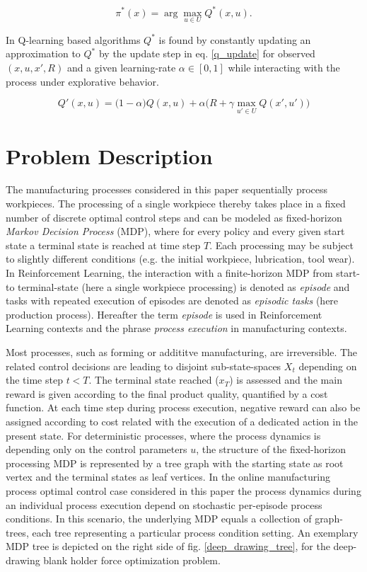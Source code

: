 \begin{equation}
\label{optimal_pi}
\pi^*(x)=\arg\max\limits_{u\in U}Q^*(x,u).
\end{equation}

In Q-learning based algorithms $Q^*$ is found by constantly updating an approximation to $Q^*$ by the update step in eq. \ref{q_update} for observed $(x, u, x', R)$ and a given learning-rate $\alpha \in [0,1]$ while interacting with the process under explorative behavior. 

\begin{equation}
\label{q_update}
Q'(x,u)=\big(1-\alpha\big)Q(x,u)+\alpha\big(R+\gamma\max\limits_{u'\in U}Q(x',u')\big)
\end{equation}

	
\section{Problem Description}
\label{problem}

The manufacturing processes considered in this paper sequentially process workpieces. The processing of a single workpiece thereby takes place in a fixed number of discrete optimal control steps and can be modeled as fixed-horizon \textit{Markov Decision Process} (MDP), where for every policy and every given start state a terminal state is reached at time step $T$. Each processing may be subject to slightly different conditions (e.g. the initial workpiece, lubrication, tool wear). In Reinforcement Learning, the interaction with a finite-horizon MDP from start- to terminal-state (here a single workpiece processing) is denoted as \textit{episode} and tasks with repeated execution of episodes are denoted as \textit{episodic tasks} (here production process). Hereafter the term \textit{episode} is used in Reinforcement Learning contexts and the phrase \textit{process execution} in manufacturing contexts.

Most processes, such as forming or addititve manufacturing, are irreversible. The related control decisions are leading to disjoint sub-state-spaces $X_t$ depending on the time step $t<T$. The terminal state reached ($x_T$) is assessed and the main reward is given according to the final product quality, quantified by a cost function. At each time step during process execution, negative reward can also be assigned according to cost related with the execution of a dedicated action in the present state. For deterministic processes, where the process dynamics is depending only on the control parameters $u$, the structure of the fixed-horizon processing MDP is represented by a tree graph with the starting state as root vertex and the terminal states as leaf vertices. In the online manufacturing process optimal control case considered in this paper the process dynamics during an individual process execution depend on stochastic per-episode process conditions. In this scenario, the underlying MDP equals a collection of graph-trees, each tree representing a particular process condition setting. An exemplary MDP tree is depicted on the right side of fig. \ref{deep_drawing_tree}, for the deep-drawing blank holder force optimization problem. 

